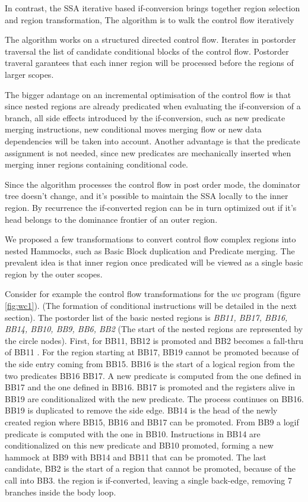 In contrast, the SSA iterative based if-conversion  brings together region selection and region transformation, The algorithm is to walk the control flow iteratively 

The algorithm works on a structured directed control flow. Iterates in postorder traversal the list of candidate conditional blocks of the control flow. Postorder traveral garantees that each inner region will be processed before the regions of larger scopes.

The bigger adantage on an incremental optimisation of the control flow is that since nested regions are already predicated when evaluating the if-conversion of a branch, all side effects introduced by the if-conversion, such as new predicate merging instructions, new conditional moves merging flow or new data dependencies will be taken into account. Another advantage is that the predicate assignment is not needed, since new predicates are mechanically inserted when merging inner regions containing conditional code.

Since the algorithm processes the control flow in post order mode, the dominator tree doesn't change, and it's possible to maintain the SSA locally to the inner region. By recurrence the if-converted region can be in turn optimized out if it's head belongs to the dominance frontier of an outer region.

We proposed a few transformations to convert control flow complex regions into nested Hammocks, such as Basic Block duplication and Predicate merging. The prevalent idea is that inner region once predicated will be viewed as a single basic region by the outer scopes.

Consider for example the control flow transformations for the $wc$ program (figure \ref{fig:wc1}).
(The formation of conditional instructions will be detailed in the next section).
 The postorder list of the basic nested regions is {\em BB11, BB17, BB16, BB14, BB10, BB9, BB6, BB2} (The start of the nested regions are represented by the circle nodes). First, for BB11, BB12 is promoted and BB2 becomes a fall-thru of BB11 . For the region starting at BB17, BB19 cannot be promoted because of the side entry coming from BB15. BB16 is the start of a logical region from the two predicates BB16 BB17. A new predicate is computed from the one defined in BB17 and the one defined in BB16. BB17 is promoted and the registers alive in BB19 are conditionalized with the new predicate. The process continues on BB16. BB19 is duplicated to remove the side edge. BB14 is the head of the newly created region where BB15, BB16 and BB17 can be promoted. From BB9 a logif predicate is computed with the one in BB10. Instructions in BB14 are conditionalized on this new predicate and BB10 promoted, forming a new hammock at BB9 with BB14 and BB11 that can be promoted. The last candidate, BB2 is the start of a region that cannot be promoted, because of the call into BB3. the region is if-converted, leaving a single back-edge, removing 7 branches inside the body loop.

